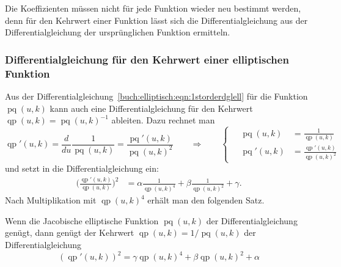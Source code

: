 Die Koeffizienten müssen nicht für jede Funktion wieder neu bestimmt
werden, denn für den Kehrwert einer Funktion lässt sich die
Differentialgleichung aus der Differentialgleichung der ursprünglichen
Funktion ermitteln.

%
%
\subsubsection{Differentialgleichung für den Kehrwert einer elliptischen Funktion}
Aus der Differentialgleichung~\eqref{buch:elliptisch:eqn:1storderdglell}
für die Funktion $\operatorname{pq}(u,k)$ kann auch eine
Differentialgleichung für den Kehrwert
$\operatorname{qp}(u,k)=\operatorname{pq}(u,k)^{-1}$
ableiten.
Dazu rechnet man
\[
\operatorname{qp}'(u,k)
=
\frac{d}{du}\frac{1}{\operatorname{pq}(u,k)}
=
\frac{\operatorname{pq}'(u,k)}{\operatorname{pq}(u,k)^2}
\qquad\Rightarrow\qquad
\left\{
\quad
\begin{aligned}
\operatorname{pq}(u,k)
&=
\frac{1}{\operatorname{qp}(u,k)}
\\
\operatorname{pq}'(u,k)
&=
\frac{\operatorname{qp}'(u,k)}{\operatorname{qp}(u,k)^2}
\end{aligned}
\right.
\]
und setzt in die Differentialgleichung ein:
\begin{align*}
\biggl(
\frac{
\operatorname{qp}'(u,k)
}{
\operatorname{qp}(u,k)
}
\biggr)^2
&=
\alpha \frac{1}{\operatorname{qp}(u,k)^4}
+
\beta \frac{1}{\operatorname{qp}(u,k)^2}
+
\gamma.
\end{align*}
Nach Multiplikation mit $\operatorname{qp}(u,k)^4$ erhält man den
folgenden Satz.

\begin{satz}
%
Wenn die Jacobische elliptische Funktion $\operatorname{pq}(u,k)$
der Differentialgleichung genügt, dann genügt der Kehrwert
$\operatorname{qp}(u,k) = 1/\operatorname{pq}(u,k)$ der Differentialgleichung
\begin{equation}
(\operatorname{qp}'(u,k))^2
= 
\gamma \operatorname{qp}(u,k)^4
+
\beta \operatorname{qp}(u,k)^2
+
\alpha
\label{buch:elliptisch:eqn:kehrwertdgl}
\end{equation}
\end{satz}

